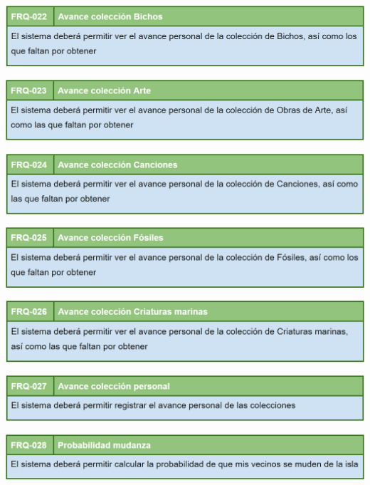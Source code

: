 	\bigskip
	
	\includegraphics[width=\textwidth]{img/cap5/FR/22.png}
	
	\bigskip
	
	\includegraphics[width=\textwidth]{img/cap5/FR/23.png}
	
	\bigskip
	
	\includegraphics[width=\textwidth]{img/cap5/FR/24.png}
	
	\bigskip
	
	\includegraphics[width=\textwidth]{img/cap5/FR/25.png}
	
	\bigskip
	
	\includegraphics[width=\textwidth]{img/cap5/FR/26.png}
	
	\bigskip
	
	\includegraphics[width=\textwidth]{img/cap5/FR/27.png}
	
	\bigskip
	
	\includegraphics[width=\textwidth]{img/cap5/FR/28.png}
	
